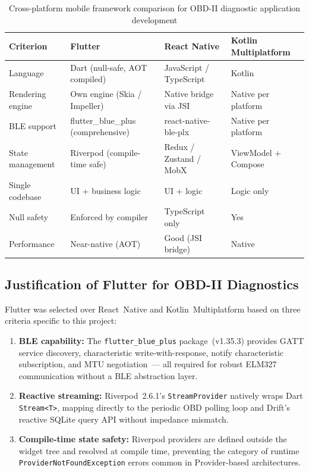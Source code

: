 \begin{table}[!htbp]
\centering
\caption{Cross-platform mobile framework comparison for OBD-II diagnostic application development}
\label{tab:frameworks}
\begin{tabularx}{0.98\linewidth}{p{3.2cm} X X X}
\toprule
\rowcolor{tblhdr}
\color{white}\textbf{Criterion} &
\color{white}\textbf{Flutter} &
\color{white}\textbf{React Native} &
\color{white}\textbf{Kotlin Multiplatform} \\
\midrule
Language         & Dart (null-safe, AOT compiled) & JavaScript / TypeScript & Kotlin \\
Rendering engine & Own engine (Skia / Impeller)   & Native bridge via JSI   & Native per platform \\
BLE support      & flutter\_blue\_plus (comprehensive) & react-native-ble-plx & Native per platform \\
State management & Riverpod (compile-time safe)   & Redux / Zustand / MobX  & ViewModel + Compose \\
Single codebase  & UI + business logic            & UI + logic              & Logic only \\
Null safety      & Enforced by compiler           & TypeScript only         & Yes \\
Performance      & Near-native (AOT)              & Good (JSI bridge)       & Native \\
\bottomrule
\end{tabularx}
\end{table}

\subsection{Justification of Flutter for OBD-II Diagnostics}

Flutter was selected over React~Native and Kotlin~Multiplatform based on three criteria specific to this project:

\begin{enumerate}
  \item \textbf{BLE capability:} The \texttt{flutter\_blue\_plus} package~(v1.35.3) provides GATT service discovery, characteristic write-with-response, notify characteristic subscription, and MTU negotiation~--- all required for robust ELM327 communication without a BLE abstraction layer.
  \item \textbf{Reactive streaming:} Riverpod~2.6.1's \texttt{StreamProvider} natively wraps Dart \texttt{Stream<T>}, mapping directly to the periodic OBD polling loop and Drift's reactive SQLite query API without impedance mismatch.
  \item \textbf{Compile-time state safety:} Riverpod providers are defined outside the widget tree and resolved at compile time, preventing the category of runtime \texttt{ProviderNotFoundException} errors common in Provider-based architectures.
\end{enumerate}

